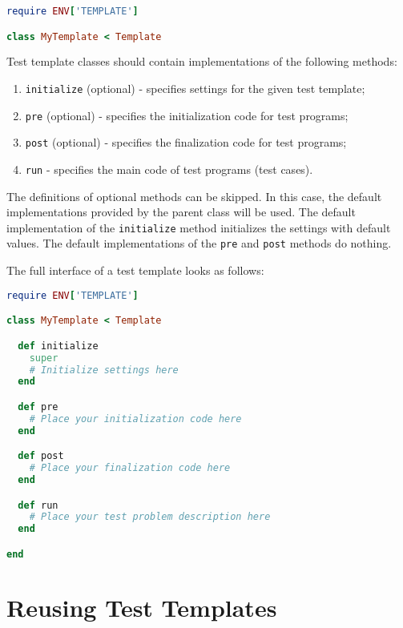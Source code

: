 \documentclass[oneside,final,12pt]{extreport}
\begin{document}
\begin{lstlisting}[language=ruby]
require ENV['TEMPLATE']

class MyTemplate < Template
\end{lstlisting}

Test template classes should contain implementations of the following methods:

\begin{enumerate}
  \item \texttt{initialize} (optional) - specifies settings for the given test template;
  \item \texttt{pre} (optional) - specifies the initialization code for test programs;
  \item \texttt{post} (optional) - specifies the finalization code for test programs;
  \item \texttt{run} - specifies the main code of test programs (test cases).
\end{enumerate}

The definitions of optional methods can be skipped. In this case, the default
implementations provided by the parent class will be used. The default implementation
of the \texttt{initialize} method initializes the settings with default values. The default
implementations of the \texttt{pre} and \texttt{post} methods do nothing.

The full interface of a test template looks as follows:

\begin{lstlisting}[language=ruby]
require ENV['TEMPLATE']

class MyTemplate < Template

  def initialize
    super
    # Initialize settings here 
  end

  def pre
    # Place your initialization code here
  end

  def post
    # Place your finalization code here
  end

  def run
    # Place your test problem description here
  end

end
\end{lstlisting}


\section{Reusing Test Templates}
\end{document}

